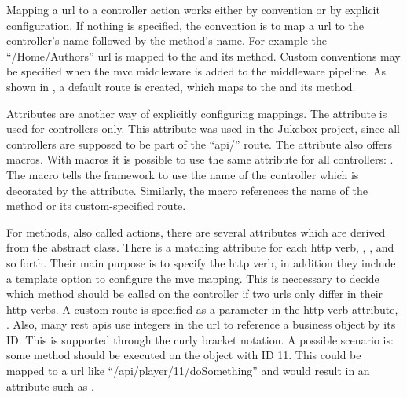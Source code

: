 


Mapping a \gls{url} to a controller action works either by convention or by explicit configuration. If nothing is specified, the convention is to map a \gls{url} to the controller's name followed by the method's name. For example the \enquote{/Home/Authors} \gls{url} is mapped to the  and its  method. Custom conventions may be specified when the \gls{mvc} middleware is added to the middleware pipeline. As shown in , a default route is created, which maps to the  and its  method.


Attributes are another way of explicitly configuring mappings. The \lstcode{[Route]} attribute is used for controllers only. This attribute was used in the Jukebox project, since all controllers are supposed to be part of the \enquote{api/} route. The \lstcode{[Route]} attribute also offers macros. With macros it is possible to use the same attribute for all controllers: . The \lstcode{[controller]} macro tells the framework to use the name of the controller which is decorated by the \lstcode{[Route]} attribute. Similarly, the \lstcode{[action]} macro references the name of the method or its custom-specified route.

For methods, also called actions, there are several attributes which are derived from the abstract  class. There is a matching attribute for each \gls{http} verb, \zB \lstcode{[HttpPost]}, \lstcode{[HttpGet]}, and so forth. Their main purpose is to specify the \gls{http} verb, in addition they include a template option to configure the \gls{mvc} mapping. This is neccessary to decide which method should be called on the controller if two \gls{url}s only differ in their \gls{http} verbs. A custom route is specified as a parameter in the \gls{http} verb attribute, \zB {}. Also, many \gls{rest} \gls{api}s use integers in the \gls{url} to reference a business object by its ID. This is supported through the curly bracket notation. A possible scenario is: some method should be executed on the  object with ID 11. This could be mapped to a \gls{url} like \enquote{/api/player/11/doSomething} and would result in an attribute such as . \cite{mvcRouting}



